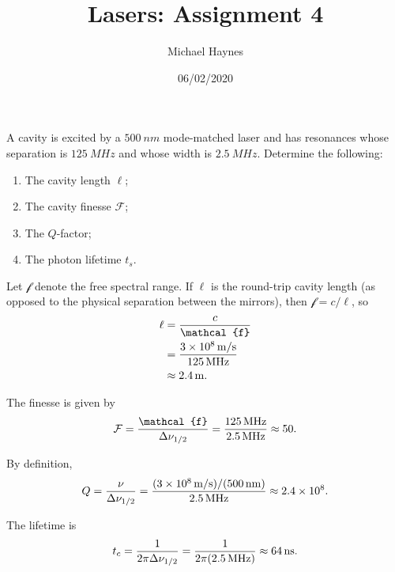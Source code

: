 \documentclass{article}
\newcounter{problem}
\newcounter{problempart}
\newcommand{\theheadertitle}{}
\newcommand{\headertitle}[1]{\renewcommand{\theheadertitle}{#1}}
\numberwithin{equation}{problem}
\newcommand{\tx}[1]{\textnormal{#1}}
\newcommand{\ds}{\displaystyle}
\newcommand{\eff}{\mathcal{f}}
\theoremstyle{definition}
\theoremstyle{remark}
\begin{document}
\author{Michael Haynes}
\title{Lasers: Assignment 4}
\headertitle{HW 4}
\date{06/02/2020}
\titlepage
\maketitle

\newpage
\begin{problem}[Problem 1][Nagourney 3.1] \label{3.1}

\begin{problemstatement}
A cavity is excited by a $\SI{500}{nm}$ mode-matched laser and has resonances whose separation is $\SI{125}{MHz}$ and whose width is $\SI{2.5}{MHz}$.  Determine the following:
\begin{enumerate}[label=(\alph*)]
	\item The cavity length $\ell$;
	\item The cavity finesse $\mathcal{F}$;
	\item The $Q$-factor;
	\item The photon lifetime $t_s$.
\end{enumerate}

\end{problemstatement}

\begin{problempartsimple}[(a)]
Let $\eff$ denote the free spectral range.  If $\ell$ is the round-trip cavity length (as opposed to the physical separation between the mirrors), then $\ds \eff = c / \ell$, so
\begin{align*}
\ell &= \frac{c}{\eff} \\
&= \frac{\SI{3e8}{m/s}}{\SI{125}{MHz}} \\
&\approx \SI{2.4}{m} \tx{.}
\end{align*}
\end{problempartsimple}

\begin{problempartsimple}[(b)]
The finesse is given by
\[
\mathcal{F} = \frac{\eff}{\Delta \nu_{1/2}} = \frac{\SI{125}{MHz}}{\SI{2.5}{MHz}} \approx 50 \tx{.}
\]
\end{problempartsimple}

\begin{problempartsimple}[(c)]
By definition,
\[
Q = \frac{\nu}{\Delta \nu_{1/2}} = \frac{(\SI{3e8}{m/s}) / (\SI{500}{nm})}{\SI{2.5}{MHz}} \approx \num{2.4e8} \tx{.}
\]
\end{problempartsimple}

\begin{problempartsimple}[(d)]
The lifetime is 
\[
t_c = \frac{1}{2\pi \Delta \nu_{1/2}} = \frac{1}{2\pi(\SI{2.5}{MHz})} \approx \SI{64}{ns} \tx{.}
\]

\end{problempartsimple}

\end{problem}
\end{document}
